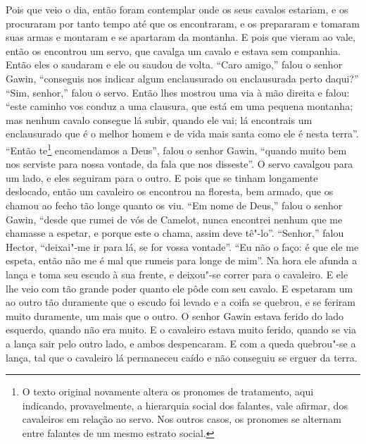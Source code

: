 Pois que veio o dia, então foram contemplar onde os seus cavalos estariam, e os
procuraram por tanto tempo até que os encontraram, e os prepararam e tomaram
suas armas e montaram e se apartaram da montanha. E pois que vieram ao vale,
então os encontrou um servo, que cavalga um cavalo e estava sem companhia.
Então eles o saudaram e ele ou saudou de volta. “Caro amigo,” falou o senhor
Gawin, “conseguis nos indicar algum enclausurado ou enclausurada perto daqui?”
“Sim, senhor,” falou o servo. Então lhes mostrou uma via à mão direita e falou:
``este caminho vos conduz a uma clausura, que está em uma pequena montanha; mas
nenhum cavalo consegue lá subir, quando ele vai; lá encontrais um enclausurado
que é o melhor homem e de vida mais santa como ele é nesta terra”. “Então
te\footnote{ O texto original  novamente altera os pronomes de tratamento, aqui
indicando, provavelmente, a hierarquia social dos falantes, vale afirmar, dos
cavaleiros em relação ao servo. Nos outros casos, os pronomes se alternam entre
falantes de um mesmo estrato social.}  encomendamos a Deus”, falou o
senhor Gawin, “quando muito bem nos serviste para nossa vontade, da fala que
nos disseste”.  O servo cavalgou para um lado, e eles seguiram para o
outro. E pois que se tinham longamente deslocado, então um cavaleiro os
encontrou na floresta, bem armado, que os chamou ao fecho tão longe quanto os
viu. “Em nome de Deus,” falou o senhor Gawin, “desde que rumei de vós de
Camelot, nunca encontrei nenhum que me chamasse a espetar, e porque este o
chama, assim deve tê"-lo”. “Senhor,” falou Hector, “deixai"-me ir para lá, se for
vossa vontade”. “Eu não o faço: é que ele me espeta, então não me é mal que
rumeis para longe de mim”. Na hora ele afunda a lança e toma seu escudo à sua
frente, e deixou"-se correr para o cavaleiro. E ele lhe veio com tão grande
poder quanto ele pôde com seu cavalo. E espetaram um ao outro  tão duramente
que o escudo foi levado e a coifa se quebrou, e se feriram muito duramente, um
mais que o outro. O senhor Gawin estava ferido do lado esquerdo, quando não era
muito. E o cavaleiro estava muito ferido, quando se via a lança sair pelo outro
lado, e ambos despencaram. E com a queda quebrou"-se a lança, tal que o
cavaleiro lá permaneceu caído e não conseguiu se erguer da terra. 

